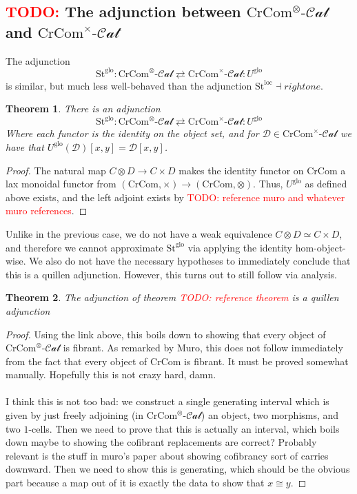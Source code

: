 \documentclass[12pt]{article}
\newtheorem{theorem}{Theorem}[section]
\theoremstyle{definition}
\newcommand{\TODO}[1]{\textcolor{red}{TODO: {#1}}}
\newcommand{\D}{\mathcal{D}}
\newcommand{\crcom}{\text{CrCom}}
\newcommand{\cartcrossedcat}{\crcom^\times\text{-}\mathcal{Cat}}
\newcommand{\tensorcrossedcat}{\crcom^\otimes\text{-}\mathcal{Cat}}
\newcommand{\st}{\text{St}}
\newcommand{\leftone}{\st^{\text{loc}}}
\newcommand{\lefttwo}{\st^{\text{glo}}}
\newcommand{\righttwo}{U^{\text{glo}}}
\begin{document}
\subsection{\TODO{} The adjunction between $\tensorcrossedcat$ and $\cartcrossedcat$}
	The adjunction
	$$
		\lefttwo: \tensorcrossedcat \rightleftarrows \cartcrossedcat : \righttwo
	$$
	is similar, but much less well-behaved than the adjunction $\leftone \dashv rightone$. 
	\begin{theorem}
		There is an adjunction 
		$$
		\lefttwo: \tensorcrossedcat \rightleftarrows \cartcrossedcat : \righttwo
		$$
		Where each functor is the identity on the object set, and for $\D \in \cartcrossedcat$ we have that $\righttwo(\D)[x,y] = \D[x,y]$. 
	\end{theorem}
	\begin{proof}
		The natural map $C \otimes D \to C \times D$ makes the identity functor on $\crcom$ a lax monoidal functor from $(\crcom, \times) \to (\crcom, \otimes)$. 
		Thus, $\righttwo$ as defined above exists, and the left adjoint exists by \TODO{reference muro and whatever muro references}. 
	\end{proof}
	Unlike in the previous case, we do not have a weak equivalence $C \otimes D \simeq C \times D$, and therefore we cannot approximate $\lefttwo$ via applying the identity hom-object-wise. 
	We also do not have the necessary hypotheses to immediately conclude that this is a quillen adjunction. However, this turns out to still follow via analysis.
	\begin{theorem}
		The adjunction of theorem \TODO{reference theorem} is a quillen adjunction
	\end{theorem}
	\begin{proof}
		Using the link above, this boils down to showing that every object of $\tensorcrossedcat$ is fibrant. 
		As remarked by Muro, this does not follow immediately from the fact that every object of $\crcom$ is fibrant. 
		It must be proved somewhat manually. Hopefully this is not crazy hard, damn.
		\\\\
		I think this is not too bad: we construct a single generating interval which is given by just freely adjoining (in $\tensorcrossedcat$) an object, two morphisms, and two $1$-cells. 
		Then we need to prove that this is actually an interval, which boils down maybe to showing the cofibrant replacements are correct? Probably relevant is the stuff in muro's paper about showing cofibrancy sort of carries downward. 
		Then we need to show this is generating, which should be the obvious part because a map out of it is exactly the data to show that $x \cong y$.
	\end{proof} 
	
\end{document}
